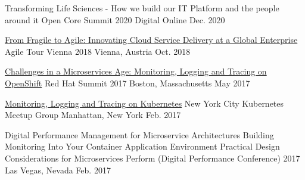

\begin{cventries}

  \cventry
    {Transforming Life Sciences - How we build our IT Platform and the people around it}
    {Open Core Summit 2020 Digital}
    {Online}
    {Dec. 2020}
    {}

    \vspace{-4mm}

  \cventry
    {\href{https://speakerdeck.com/getcloudnative/innovating-cloud-service-delivery-at-a-global-enterprise}{From Fragile to Agile: Innovating Cloud Service Delivery at a Global Enterprise}}
    {Agile Tour Vienna 2018}
    {Vienna, Austria}
    {Oct. 2018}
    {}

    \vspace{-4mm}

  \cventry
    {\href{https://www.slideshare.net/MartinEtmajer/challenges-in-a-microservices-age-monitoring-logging-and-tracing-on-red-hat-openshift}{Challenges in a Microservices Age: Monitoring, Logging and Tracing on OpenShift}}
    {Red Hat Summit 2017}
    {Boston, Massachusetts}
    {May 2017}
    {}

    \vspace{-4mm}

  \cventry
    {\href{https://www.slideshare.net/MartinEtmajer/monitoring-logging-and-tracing-on-kubernetes}{Monitoring, Logging and Tracing on Kubernetes}}
    {New York City Kubernetes Meetup Group}
    {Manhattan, New York}
    {Feb. 2017}
    {}

    \vspace{-4mm}

  \cventry
    {
      Digital Performance Management for Microservice Architectures \vspace{-1mm} \break
       \break
      Building Monitoring Into Your Container Application Environment \vspace{-1mm} \break
       \break
      Practical Design Considerations for Microservices
    }
    {Perform (Digital Performance Conference) 2017}
    {Las Vegas, Nevada}
    {
      Feb. 2017 \break \break \break \break
    }
    {}


\end{cventries}
